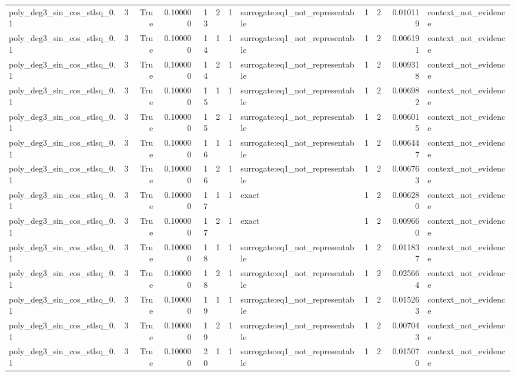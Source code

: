 \begin{tabular}{lrrrrrrlrrrl}
poly\_deg3\_sin\_cos\_stlsq\_0.1 & 3 & True & 0.100000 & 13 & 2 & 1 & surrogate:eq1\_not\_representable & 1 & 2 & 0.010119 & context\_not\_evidence \\
poly\_deg3\_sin\_cos\_stlsq\_0.1 & 3 & True & 0.100000 & 14 & 1 & 1 & surrogate:eq1\_not\_representable & 1 & 2 & 0.006191 & context\_not\_evidence \\
poly\_deg3\_sin\_cos\_stlsq\_0.1 & 3 & True & 0.100000 & 14 & 2 & 1 & surrogate:eq1\_not\_representable & 1 & 2 & 0.009318 & context\_not\_evidence \\
poly\_deg3\_sin\_cos\_stlsq\_0.1 & 3 & True & 0.100000 & 15 & 1 & 1 & surrogate:eq1\_not\_representable & 1 & 2 & 0.006982 & context\_not\_evidence \\
poly\_deg3\_sin\_cos\_stlsq\_0.1 & 3 & True & 0.100000 & 15 & 2 & 1 & surrogate:eq1\_not\_representable & 1 & 2 & 0.006015 & context\_not\_evidence \\
poly\_deg3\_sin\_cos\_stlsq\_0.1 & 3 & True & 0.100000 & 16 & 1 & 1 & surrogate:eq1\_not\_representable & 1 & 2 & 0.006447 & context\_not\_evidence \\
poly\_deg3\_sin\_cos\_stlsq\_0.1 & 3 & True & 0.100000 & 16 & 2 & 1 & surrogate:eq1\_not\_representable & 1 & 2 & 0.006763 & context\_not\_evidence \\
poly\_deg3\_sin\_cos\_stlsq\_0.1 & 3 & True & 0.100000 & 17 & 1 & 1 & exact & 1 & 2 & 0.006280 & context\_not\_evidence \\
poly\_deg3\_sin\_cos\_stlsq\_0.1 & 3 & True & 0.100000 & 17 & 2 & 1 & exact & 1 & 2 & 0.009660 & context\_not\_evidence \\
poly\_deg3\_sin\_cos\_stlsq\_0.1 & 3 & True & 0.100000 & 18 & 1 & 1 & surrogate:eq1\_not\_representable & 1 & 2 & 0.011837 & context\_not\_evidence \\
poly\_deg3\_sin\_cos\_stlsq\_0.1 & 3 & True & 0.100000 & 18 & 2 & 1 & surrogate:eq1\_not\_representable & 1 & 2 & 0.025664 & context\_not\_evidence \\
poly\_deg3\_sin\_cos\_stlsq\_0.1 & 3 & True & 0.100000 & 19 & 1 & 1 & surrogate:eq1\_not\_representable & 1 & 2 & 0.015263 & context\_not\_evidence \\
poly\_deg3\_sin\_cos\_stlsq\_0.1 & 3 & True & 0.100000 & 19 & 2 & 1 & surrogate:eq1\_not\_representable & 1 & 2 & 0.007043 & context\_not\_evidence \\
poly\_deg3\_sin\_cos\_stlsq\_0.1 & 3 & True & 0.100000 & 20 & 1 & 1 & surrogate:eq1\_not\_representable & 1 & 2 & 0.015070 & context\_not\_evidence \\

\end{tabular}
